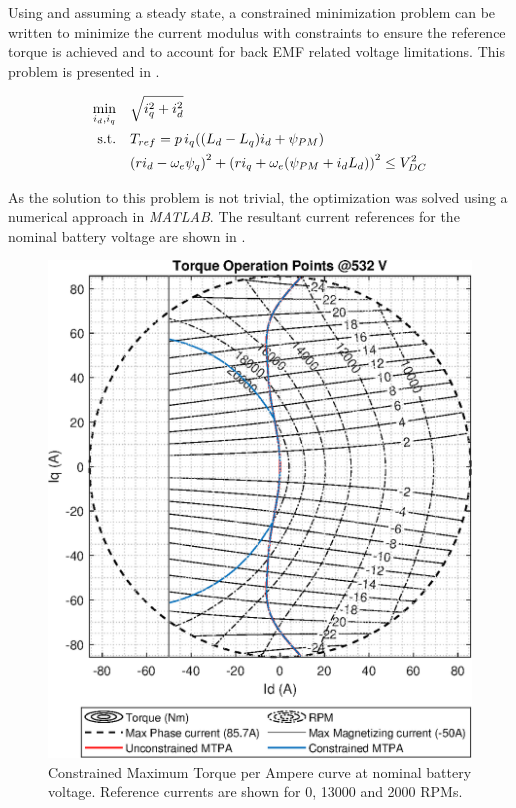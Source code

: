 \documentclass[9pt,conference]{IEEEtran}
\begin{document}
Using  and assuming a steady state, a constrained minimization problem can be written to minimize the current modulus with constraints to ensure the reference torque is achieved and to account for back EMF related voltage limitations. This problem is presented in .

\begin{equation}
	\begin{aligned}
		\min_{i_d,i_q} \quad & \sqrt{i_q^2 + i_d^2} \\
		\rm{s.t.}  \quad & T_{ref} = p\, i_q((L_d - L_q)i_d + \psi_{PM})\\
		               \quad & {(r i_d -\omega_e \psi_q)}^2 + {(r i_q + \omega_e (\psi_{PM} + i_d L_d))}^2\leq V_{DC}^2            \\
	\end{aligned}
	\label{eq:mtpa_problem_with_voltage_constraint} %
\end{equation}

As the solution to this problem is not trivial, the optimization was solved using a numerical approach in \textit{MATLAB}. The resultant current references for the nominal battery voltage are shown in .


\begin{figure}[!htb]
    \centering
    \includegraphics[width=0.8\linewidth]{Figures/Motor_map@532V}
	\caption{Constrained Maximum Torque per Ampere curve at nominal battery voltage. Reference currents are shown for 0, 13000 and 2000 RPMs.}
	\label{fig:mtpa_constrained}%
\end{figure}
\end{document}
